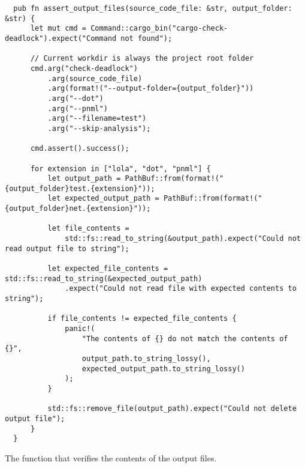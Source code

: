 \begin{listing}[!htbp]
  \begin{verbatim}
  pub fn assert_output_files(source_code_file: &str, output_folder: &str) {
      let mut cmd = Command::cargo_bin("cargo-check-deadlock").expect("Command not found");
  
      // Current workdir is always the project root folder
      cmd.arg("check-deadlock")
          .arg(source_code_file)
          .arg(format!("--output-folder={output_folder}"))
          .arg("--dot")
          .arg("--pnml")
          .arg("--filename=test")
          .arg("--skip-analysis");
  
      cmd.assert().success();
  
      for extension in ["lola", "dot", "pnml"] {
          let output_path = PathBuf::from(format!("{output_folder}test.{extension}"));
          let expected_output_path = PathBuf::from(format!("{output_folder}net.{extension}"));
  
          let file_contents =
              std::fs::read_to_string(&output_path).expect("Could not read output file to string");
  
          let expected_file_contents = std::fs::read_to_string(&expected_output_path)
              .expect("Could not read file with expected contents to string");
  
          if file_contents != expected_file_contents {
              panic!(
                  "The contents of {} do not match the contents of {}",
                  output_path.to_string_lossy(),
                  expected_output_path.to_string_lossy()
              );
          }
  
          std::fs::remove_file(output_path).expect("Could not delete output file");
      }
  }
  \end{verbatim}
  \caption{The function that verifies the contents of the output files.}
  \label{lst:assert-output-files}
\end{listing}

